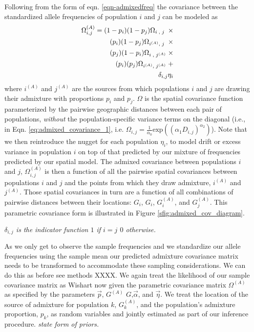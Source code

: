 \documentclass[12pt]{article}
\newcommand{\admixsource}[1]{{$G^{(A)}$}}
\newcommand{\kadmixsource}[1]{{$G^{(A)}_{#1}$}}
\newcommand{\identifyadmixsource}[1]{{#1^{(A)}}}
\newcommand{\gc}[1]{{\em \color{blue} #1}}
\begin{document}
Following from the form  of eqn. \eqref{eqn-admixedfreq} the covariance between the standardized allele frequencies of population $i$ and $j$ can be modeled as 
\begin{alignat}{3}
\label{eq:admixed_covariance_1}
\Omega_{i,j}^{(A)} = (1-p_i)(1-p_j) \Omega_{i\;,\;j\;} \; \times&\\
(p_i)(1-p_j) \Omega_{\identifyadmixsource{i},\;j\;} \; \times   \notag&\\
(p_j)(1-p_i) \Omega_{i\;,\;\identifyadmixsource{j}} \; \times   \notag&\\
(p_i)(p_j) \Omega_{\identifyadmixsource{i},\;\identifyadmixsource{j}} \; +   \notag&\\
\delta_{i,j} \eta_i \notag&
\end{alignat}
where $\identifyadmixsource{i}$ and $\identifyadmixsource{j}$ are the sources from which populations $i$ and $j$ are drawing their admixture with proportions $p_i$ and $p_j$. $\Omega$ is the spatial covariance function parameterized by the pairwise geographic distances between each pair of populations, \emph{without} the population-specific variance terms on the diagonal (i.e., in Eqn. \ref{eq:admixed_covariance_1}, i.e. $\Omega_{i,j} = \frac{1}{\alpha_0} \text{exp} \left(	\left( \alpha_1D_{i,j} \right)^{\alpha_2} \right)$). Note that we then reintroduce the nugget for each population $\eta_i$, to model drift or excess variance in population $i$ on top of that predicted by our mixture of frequencies predicted by our spatial model.
  The admixed covariance between populations $i$ and $j$, $\Omega_{i,j}^{(A)}$ is then a function of all the pairwise spatial covariances between populations $i$ and $j$ and the points from which they draw admixture, $\identifyadmixsource{i}$ and $\identifyadmixsource{j}$.  Those spatial covariances in turn are a function of all combinations of pairwise distances between their locations: $G_i$, $G_i$, \kadmixsource{i}, and \kadmixsource{j}.  This parametric covariance form is illustrated in Figure \ref{sfig:admixed_cov_diagram}.

\gc{ $\delta_{i,j} $ is the indicator function $1$ if $i=j$ $0$ otherwise. }

As we only get to observe the sample frequencies and we standardize our allele frequencies using the sample mean our predicted admixture covariance matrix needs to be transformed to accommodate these sampling considerations. We can do this as before see methods XXXX. We again treat the likelihood of our sample covariance matrix as Wishart now given the parametric covariance matrix $\Omega^{(A)}$ as specified by the parameters $\vec{p}$, \admixsource, $G$,$\vec{\alpha}$, and $\vec{\eta}$. We treat the location of the source of admixture for population $k$, \kadmixsource{k}, and the population's admixture proportion, $p_k$, as random variables and jointly estimated as part of our inference procedure. \gc{state form of priors.}
\end{document}
